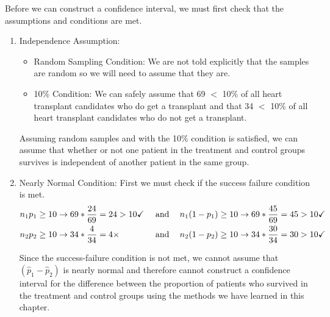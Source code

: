 {
Before we can construct a confidence interval, we must first check that the assumptions and conditions are met.
\begin{enumerate}[1.]
\item Independence Assumption: 
\begin{itemize}
\item Random Sampling Condition: We are not told explicitly that the samples are random so we will need to assume that they are.
\item 10\% Condition: We can safely assume that 69 $<$ 10\% of all heart transplant candidates who do get a transplant and that 34 $<$ 10\% of all heart transplant candidates who do not get a transplant.
\end{itemize}
Assuming random samples and with the 10\% condition is satisfied, we can assume that whether or not one patient in the treatment and control groups survives is independent of another patient in the same group.
\item Nearly Normal Condition: First we must check if the success failure condition is met.
\begin{align*}
n_1p_1 &\ge 10 \rightarrow 69 *  \frac{24}{69} = 24 > 10 \checkmark &\text{  and \hspace{2mm} } n_1(1 - p_1) &\ge 10 \rightarrow 69 *  \frac{45}{69} = 45 > 10 \checkmark \\
n_2p_2 &\ge 10 \rightarrow 34 * \frac{4}{34} = 4 \times &\text{  and \hspace{2mm} } n_2(1 - p_2) &\ge 10 \rightarrow 34 * \frac{30}{34} = 30 > 10 \checkmark \\
\end{align*}

Since the success-failure condition is not met, we cannot assume that $(\hat{p}_1 - \hat{p}_2)$ is nearly normal and therefore cannot construct a confidence interval for the difference between the proportion of patients who survived in the treatment and control groups using the methods we have learned in this chapter.

\end{enumerate}
}

